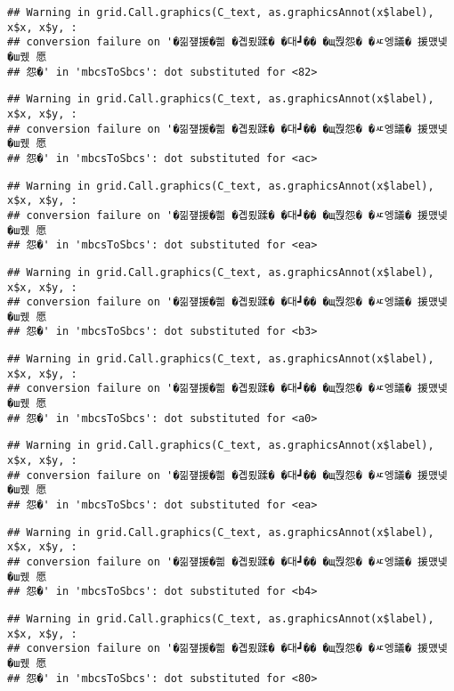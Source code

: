 \documentclass[
]{article}
\begin{document}
\begin{verbatim}
## Warning in grid.Call.graphics(C_text, as.graphicsAnnot(x$label), x$x, x$y, :
## conversion failure on '�낆쟾援�쁾 �곕룄蹂� �대┛�� �щ쭩怨� �ㅼ엥議� 援먰넻�ш퀬 愿
## 怨�' in 'mbcsToSbcs': dot substituted for <82>
\end{verbatim}

\begin{verbatim}
## Warning in grid.Call.graphics(C_text, as.graphicsAnnot(x$label), x$x, x$y, :
## conversion failure on '�낆쟾援�쁾 �곕룄蹂� �대┛�� �щ쭩怨� �ㅼ엥議� 援먰넻�ш퀬 愿
## 怨�' in 'mbcsToSbcs': dot substituted for <ac>
\end{verbatim}

\begin{verbatim}
## Warning in grid.Call.graphics(C_text, as.graphicsAnnot(x$label), x$x, x$y, :
## conversion failure on '�낆쟾援�쁾 �곕룄蹂� �대┛�� �щ쭩怨� �ㅼ엥議� 援먰넻�ш퀬 愿
## 怨�' in 'mbcsToSbcs': dot substituted for <ea>
\end{verbatim}

\begin{verbatim}
## Warning in grid.Call.graphics(C_text, as.graphicsAnnot(x$label), x$x, x$y, :
## conversion failure on '�낆쟾援�쁾 �곕룄蹂� �대┛�� �щ쭩怨� �ㅼ엥議� 援먰넻�ш퀬 愿
## 怨�' in 'mbcsToSbcs': dot substituted for <b3>
\end{verbatim}

\begin{verbatim}
## Warning in grid.Call.graphics(C_text, as.graphicsAnnot(x$label), x$x, x$y, :
## conversion failure on '�낆쟾援�쁾 �곕룄蹂� �대┛�� �щ쭩怨� �ㅼ엥議� 援먰넻�ш퀬 愿
## 怨�' in 'mbcsToSbcs': dot substituted for <a0>
\end{verbatim}

\begin{verbatim}
## Warning in grid.Call.graphics(C_text, as.graphicsAnnot(x$label), x$x, x$y, :
## conversion failure on '�낆쟾援�쁾 �곕룄蹂� �대┛�� �щ쭩怨� �ㅼ엥議� 援먰넻�ш퀬 愿
## 怨�' in 'mbcsToSbcs': dot substituted for <ea>
\end{verbatim}

\begin{verbatim}
## Warning in grid.Call.graphics(C_text, as.graphicsAnnot(x$label), x$x, x$y, :
## conversion failure on '�낆쟾援�쁾 �곕룄蹂� �대┛�� �щ쭩怨� �ㅼ엥議� 援먰넻�ш퀬 愿
## 怨�' in 'mbcsToSbcs': dot substituted for <b4>
\end{verbatim}

\begin{verbatim}
## Warning in grid.Call.graphics(C_text, as.graphicsAnnot(x$label), x$x, x$y, :
## conversion failure on '�낆쟾援�쁾 �곕룄蹂� �대┛�� �щ쭩怨� �ㅼ엥議� 援먰넻�ш퀬 愿
## 怨�' in 'mbcsToSbcs': dot substituted for <80>
\end{verbatim}
\end{document}
